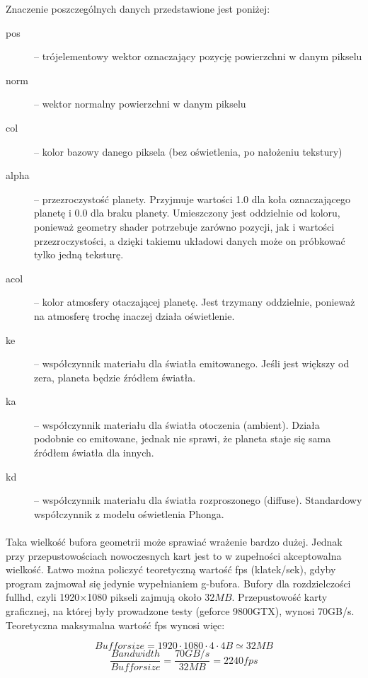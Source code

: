 Znaczenie poszczególnych danych przedstawione jest poniżej:

\begin{description}
\item[pos] -- trójelementowy wektor oznaczający pozycję powierzchni w danym pikselu
\item[norm] -- wektor normalny powierzchni w danym pikselu
\item[col] -- kolor bazowy danego piksela (bez oświetlenia, po nałożeniu tekstury)
\item[alpha] -- przezroczystość planety. Przyjmuje wartości 1.0 dla koła oznaczającego planetę i 0.0 dla braku planety. Umieszczony jest oddzielnie od koloru, ponieważ geometry shader potrzebuje zarówno pozycji, jak i wartości przezroczystości, a dzięki takiemu układowi danych może on próbkować tylko jedną teksturę.
\item[acol] -- kolor atmosfery otaczającej planetę. Jest trzymany oddzielnie, ponieważ na atmosferę trochę inaczej działa oświetlenie.
\item[ke] -- współczynnik materiału dla światła emitowanego. Jeśli jest większy od zera, planeta będzie źródłem światła.
\item[ka] -- współczynnik materiału dla światła otoczenia (ambient). Działa podobnie co emitowane, jednak nie sprawi, że planeta staje się sama źródłem światła dla innych.
\item[kd] -- współczynnik materiału dla światła rozproszonego (diffuse). Standardowy współczynnik z modelu oświetlenia Phonga.
\end{description}

\paragraph{}

Taka wielkość bufora geometrii może sprawiać wrażenie bardzo dużej. Jednak przy przepustowościach nowoczesnych kart jest to w zupełności akceptowalna wielkość. Łatwo można policzyć teoretyczną wartość fps (klatek/sek), gdyby program zajmował się jedynie wypełnianiem g-bufora. Bufory dla rozdzielczości fullhd, czyli 1920$\times$1080 pikseli zajmują około $32MB$. Przepustowość karty graficznej, na której były prowadzone testy (geforce 9800GTX), wynosi 70GB/s. Teoretyczna maksymalna wartość fps wynosi więc:

$$ Buffor size = 1920 \cdot 1080 \cdot 4 \cdot 4B \simeq 32MB $$
$$ \frac{Bandwidth}{Buffor size} = \frac{70GB/s}{32MB} = 2240 fps $$

